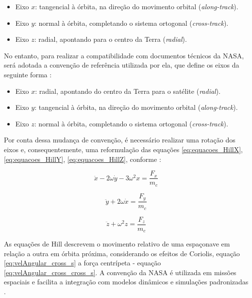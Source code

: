 \begin{itemize}
    \item Eixo $x$: tangencial à órbita, na direção do movimento orbital (\emph{along-track}).
    \item Eixo $y$: normal à órbita, completando o sistema ortogonal  (\emph{cross-track}).
    \item Eixo $z$: radial, apontando para o centro da Terra  (\emph{radial}).
\end{itemize}

No entanto, para realizar a compatibilidade com documentos técnicos da NASA, será adotada a convenção de referência utilizada por ela, que define os eixos da seguinte forma \cite{Folta2022}:

\begin{itemize}
    \item Eixo $x$: radial, apontando do centro da Terra para o satélite (\emph{radial}).
    \item Eixo $y$: tangencial à órbita, na direção do movimento orbital  (\emph{along-track}).
    \item Eixo $z$: normal à órbita, completando o sistema ortogonal  (\emph{cross-track}).
\end{itemize}

Por conta dessa mudança de convenção, é necessário realizar uma rotação dos eixos e, consequentemente, uma reformulação das equações \eqref{eq:equacoes_HillX}, \eqref{eq:equacoes_HillY}, \eqref{eq:equacoes_HillZ}, conforme \cite{sidi1997spacecraft}:

\begin{equation}
    \label{eq:Hill_NASA_X}
    \ddot{x} - 2\omega \dot{y} - 3\omega^2 x = \frac{F_x}{m_c}
\end{equation}

\begin{equation}
    \label{eq:Hill_NASA_Y}
    \ddot{y} + 2\omega \dot{x} = \frac{F_y}{m_c}
\end{equation}

\begin{equation}
    \label{eq:Hill_NASA_Z}
    \ddot{z} + \omega^2 z = \frac{F_z}{m_c}
\end{equation}

As equações de Hill descrevem o movimento relativo de uma espaçonave em relação a outra em órbita próxima, considerando os efeitos de Coriolis, equação \eqref{eq:velAngular_cross_s} a força centrípeta - equação \eqref{eq:velAngular_cross_cross_s}. A convenção da NASA é utilizada em missões espaciais e facilita a integração com modelos dinâmicos e simulações padronizadas \cite{Folta2022}.


